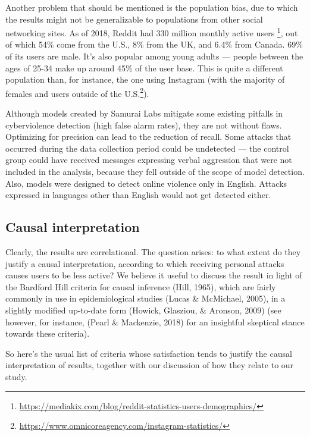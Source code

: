 \documentclass[10pt,dvipsnames]{scrartcl}
\begin{document}
Another problem that should be mentioned is the population bias, due to
which the results might not be generalizable to populations from other
social networking sites. As of 2018, Reddit had 330 million monthly
active users
\footnote{\url{https://mediakix.com/blog/reddit-statistics-users-demographics/}},
out of which 54\% come from the U.S., 8\% from the UK, and 6.4\% from
Canada. 69\% of its users are male. It's also popular among young adults
--- people between the ages of 25-34 make up around 45\% of the user
base. This is quite a different population than, for instance, the one
using Instagram (with the majority of females and users outside of the
U.S.\footnote{\url{https://www.omnicoreagency.com/instagram-statistics/}}).

Although models created by Samurai Labs mitigate some existing pitfalls
in cyberviolence detection (high false alarm rates), they are not
without flaws. Optimizing for precision can lead to the reduction of
recall. Some attacks that occurred during the data collection period
could be undetected --- the control group could have received messages
expressing verbal aggression that were not included in the analysis,
because they fell outside of the scope of model detection. Also, models
were designed to detect online violence only in English. Attacks
expressed in languages other than English would not get detected either.

\subsection{Causal interpretation}

Clearly, the results are correlational. The question arises: to what
extent do they justify a causal interpretation, according to which
receiving personal attacks causes users to be less active? We believe it
useful to discuss the result in light of the Bardford Hill criteria for
causal inference (Hill, 1965), which are fairly commonly in use in
epidemiological studies (Lucas \& McMichael, 2005), in a slightly
modified up-to-date form (Howick, Glasziou, \& Aronson, 2009) (see
however, for instance, (Pearl \& Mackenzie, 2018) for an insightful
skeptical stance towards these criteria).

So here's the usual list of criteria whose satisfaction tends to justify
the causal interpretation of results, together with our discussion of
how they relate to our study.

\vspace{2mm}
\end{document}
